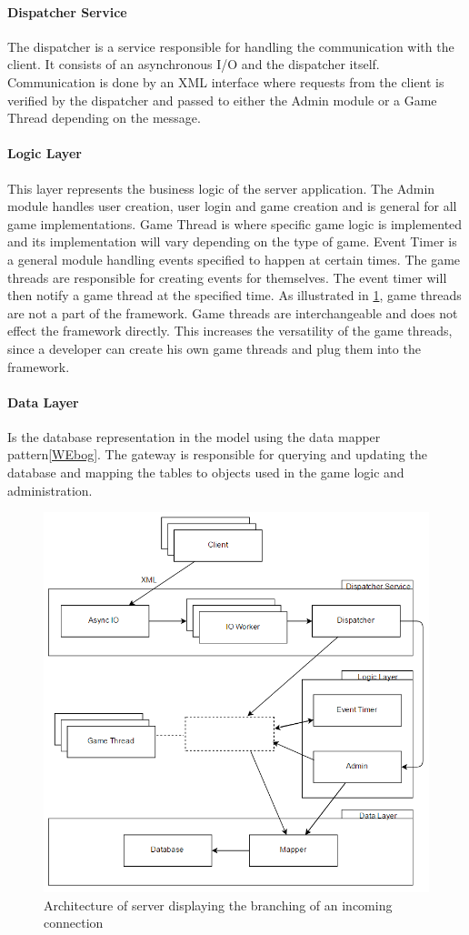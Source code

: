 \paragraph{Dispatcher Service}
The dispatcher is a service responsible for handling the communication with the client. It consists of an asynchronous I/O and the dispatcher itself. Communication is done by an XML interface where requests from the client is verified by the dispatcher and passed to either the Admin module or a Game Thread depending on the message. 

\paragraph{Logic Layer}
This layer represents the business logic of the server application. The Admin module handles user creation, user login and game creation and is general for all game implementations. Game Thread is where specific game logic is implemented and its implementation will vary depending on the type of game. Event Timer is a general module handling events specified to happen at certain times. The game threads are responsible for creating events for themselves. The event timer will then notify a game thread at the specified time. As illustrated in \cref{fig:serverarch}, game threads are not a part of the framework. Game threads are interchangeable and does not effect the framework directly. This increases the versatility of the game threads, since a developer can create his own game threads and plug them into the framework.

\paragraph{Data Layer}
Is the database representation in the model using the data mapper pattern\ref{WEbog}. The gateway is responsible for querying and updating the database and mapping the tables to objects used in the game logic and administration.

\begin{figure}[H]
  \centering
  \includegraphics[width=\textwidth]{billeder/serverarch.png}  
  \caption{Architecture of server displaying the branching of an incoming connection}
  \label{fig:serverarch}
\end{figure}